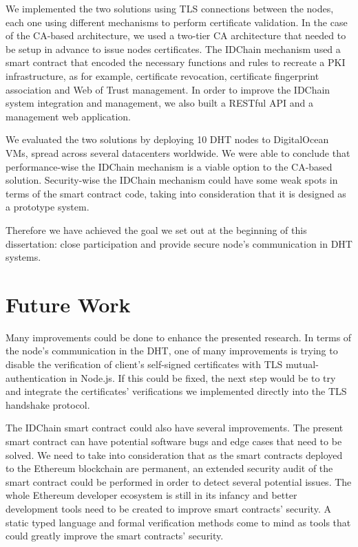 We implemented the two solutions using TLS connections between the nodes, each one using different mechanisms to perform certificate validation.
In the case of the CA-based architecture, we used a two-tier CA architecture that needed to be setup in advance to issue nodes certificates.
The IDChain mechanism used a smart contract that encoded the necessary functions and rules to recreate a \ac{PKI} infrastructure, as for example, certificate revocation, certificate fingerprint association and Web of Trust management.
In order to improve the IDChain system integration and management, we also built a RESTful API and a management web application.

We evaluated the two solutions by deploying 10 DHT nodes to DigitalOcean \acp{VM}, spread across several datacenters worldwide.
We were able to conclude that performance-wise the IDChain mechanism is a viable option to the CA-based solution.
Security-wise the IDChain mechanism could have some weak spots in terms of the smart contract code, taking into consideration that it is designed as a prototype system.

Therefore we have achieved the goal we set out at the beginning of this dissertation: close participation and provide secure node's communication in DHT systems.

\section{Future Work}
\label{section:future}

Many improvements could be done to enhance the presented research.
In terms of the node's communication in the DHT, one of many improvements is trying to disable the verification of client's self-signed certificates with TLS mutual-authentication in Node.js.
If this could be fixed, the next step would be to try and integrate the certificates' verifications we implemented directly into the TLS handshake protocol.

The IDChain smart contract could also have several improvements.
The present smart contract can have potential software bugs and edge cases that need to be solved.
We need to take into consideration that as the smart contracts deployed to the Ethereum blockchain are permanent, an extended security audit of the smart contract could be performed in order to detect several potential issues.
The whole Ethereum developer ecosystem is still in its infancy and better development tools need to be created to improve smart contracts' security.
A static typed language and formal verification methods come to mind as tools that could greatly improve the smart contracts' security.

